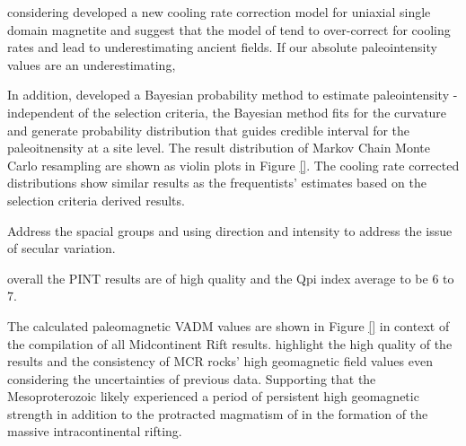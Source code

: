 \documentclass[draft]{agujournal2019}
\begin{document}
considering  developed a new cooling rate correction model for uniaxial single domain magnetite and suggest that the model of  tend to over-correct for cooling rates and lead to underestimating ancient fields. If our absolute paleointensity values are an underestimating, 


In addition, \cite{Cych2021a} developed a Bayesian probability method to estimate paleointensity - independent of the selection criteria, the Bayesian method fits for the curvature and generate probability distribution that guides credible interval for the paleoitnensity at a site level. The result distribution of Markov Chain Monte Carlo resampling are shown as violin plots in Figure \ref{}. The cooling rate corrected distributions show similar results as the frequentists' estimates based on the selection criteria derived results. 

Address the spacial groups and using direction and intensity to address the issue of secular variation. 

overall the PINT results are of high quality and the Qpi index average to be 6 to 7. 

The calculated paleomagnetic VADM values are shown in Figure \ref{} in context of the compilation of all Midcontinent Rift results. highlight the high quality of the results and the consistency of MCR rocks' high geomagnetic field values even considering the uncertainties of previous data. Supporting that the Mesoproterozoic likely experienced a period of persistent high geomagnetic strength in addition to the protracted magmatism of in the formation of the massive intracontinental rifting. 



\end{document}
